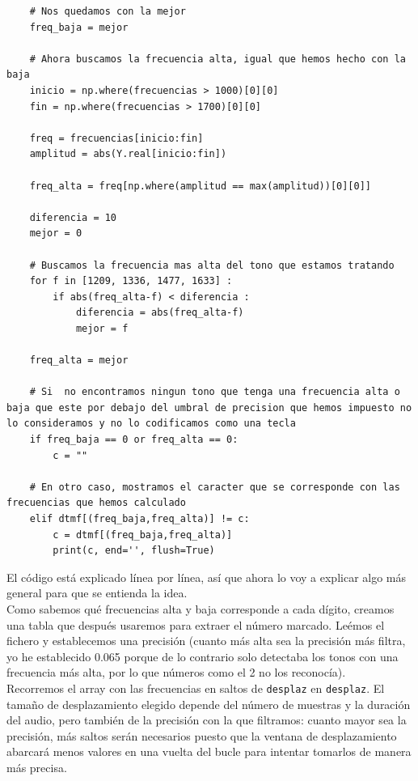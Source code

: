 \documentclass[11pt,a4paper]{article}
\begin{document}
\begin{lstlisting}
    # Nos quedamos con la mejor
    freq_baja = mejor

    # Ahora buscamos la frecuencia alta, igual que hemos hecho con la baja
    inicio = np.where(frecuencias > 1000)[0][0]
    fin = np.where(frecuencias > 1700)[0][0]

    freq = frecuencias[inicio:fin]
    amplitud = abs(Y.real[inicio:fin])

    freq_alta = freq[np.where(amplitud == max(amplitud))[0][0]]

    diferencia = 10
    mejor = 0

    # Buscamos la frecuencia mas alta del tono que estamos tratando
    for f in [1209, 1336, 1477, 1633] :
        if abs(freq_alta-f) < diferencia :
            diferencia = abs(freq_alta-f)
            mejor = f

    freq_alta = mejor

    # Si  no encontramos ningun tono que tenga una frecuencia alta o baja que este por debajo del umbral de precision que hemos impuesto no lo consideramos y no lo codificamos como una tecla
    if freq_baja == 0 or freq_alta == 0:
        c = ""

    # En otro caso, mostramos el caracter que se corresponde con las frecuencias que hemos calculado
    elif dtmf[(freq_baja,freq_alta)] != c:
        c = dtmf[(freq_baja,freq_alta)]
        print(c, end='', flush=True)

\end{lstlisting}

El código está explicado línea por línea, así que ahora lo voy a explicar algo más general para que se entienda la idea.\\

Como sabemos qué frecuencias alta y baja corresponde a cada dígito, creamos una tabla que después usaremos para extraer el número marcado. Leémos el fichero y establecemos una precisión (cuanto más alta sea la precisión más filtra, yo he establecido 0.065 porque de lo contrario solo detectaba los tonos con una frecuencia más alta, por lo que números como el 2 no los reconocía).\\

Recorremos el array con las frecuencias en saltos de \texttt{desplaz} en \texttt{desplaz}. El tamaño de desplazamiento elegido depende del número de muestras y la duración del audio, pero también de la precisión con la que filtramos: cuanto mayor sea la precisión, más saltos serán necesarios puesto que la ventana de desplazamiento abarcará menos valores en una vuelta del bucle para intentar tomarlos de manera más precisa.\\
\end{document}
